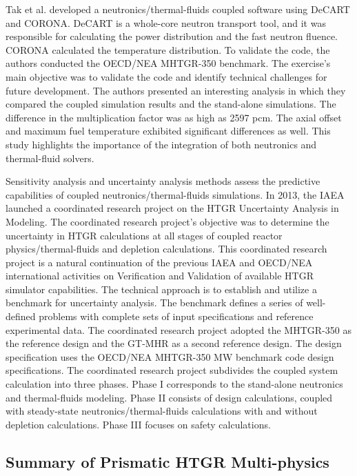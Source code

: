 Tak et al. \cite{tak_coupled_2016} developed a neutronics/thermal-fluids coupled software using DeCART \cite{kaeri_decart_2007} and CORONA.
DeCART is a whole-core neutron transport tool, and it was responsible for calculating the power distribution and the fast neutron fluence.
CORONA calculated the temperature distribution.
To validate the code, the authors conducted the OECD/NEA MHTGR-350 benchmark.
The exercise's main objective was to validate the code and identify technical challenges for future development.
The authors presented an interesting analysis in which they compared the coupled simulation results and the stand-alone simulations.
The difference in the multiplication factor was as high as 2597 pcm.
The axial offset and maximum fuel temperature exhibited significant differences as well.
This study highlights the importance of the integration of both neutronics and thermal-fluid solvers.

Sensitivity analysis and uncertainty analysis methods assess the predictive capabilities of coupled neutronics/thermal-fluids simulations.
In 2013, the IAEA launched a coordinated research project \cite{tyobeka_htgr_2011} on the HTGR Uncertainty Analysis in Modeling.
The coordinated research project's objective was to determine the uncertainty in HTGR calculations at all stages of coupled reactor physics/thermal-fluids and depletion calculations.
This coordinated research project is a natural continuation of the previous IAEA and OECD/NEA international activities \cite{iaea_evaluation_2003}\cite{reitsma_oecd-neansc_2008} on Verification and Validation of available HTGR simulator capabilities.
The technical approach is to establish and utilize a benchmark for uncertainty analysis.
The benchmark defines a series of well-defined problems with complete sets of input specifications and reference experimental data.
The coordinated research project adopted the MHTGR-350 as the reference design and the GT-MHR as a second reference design.
The design specification uses the OECD/NEA MHTGR-350 MW benchmark \cite{oecd_nea_benchmark_2017} code design specifications.
The coordinated research project subdivides the coupled system calculation into three phases.
Phase I corresponds to the stand-alone neutronics and thermal-fluids modeling.
Phase II consists of design calculations, coupled with steady-state neutronics/thermal-fluids calculations with and without depletion calculations.
Phase III focuses on safety calculations.

\subsection{Summary of Prismatic HTGR Multi-physics}

